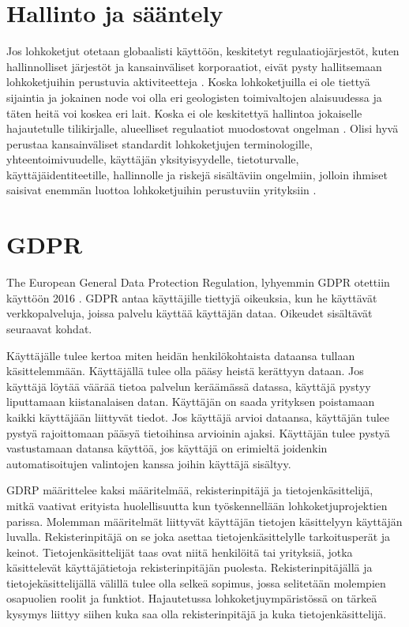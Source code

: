 \documentclass[utf8,bachelor]{gradu3}
\begin{document}
\section{Hallinto ja sääntely}
Jos lohkoketjut otetaan globaalisti käyttöön, keskitetyt regulaatiojärjestöt, kuten hallinnolliset järjestöt ja kansainväliset korporaatiot, eivät pysty hallitsemaan lohkoketjuihin perustuvia aktiviteetteja \parencite{wright2015decentralized}.
Koska lohkoketjuilla ei ole tiettyä sijaintia ja jokainen node voi olla eri geologisten toimivaltojen alaisuudessa ja täten heitä voi koskea eri lait. 
Koska ei ole keskitettyä hallintoa jokaiselle hajautetulle tilikirjalle, alueelliset regulaatiot muodostovat ongelman \parencite{cermeno2016blockchain}.
Olisi hyvä perustaa kansainväliset standardit lohkoketjujen terminologille, yhteentoimivuudelle, käyttäjän yksityisyydelle, tietoturvalle, käyttäjäidentiteetille, hallinnolle ja riskejä sisältäviin ongelmiin, jolloin ihmiset saisivat enemmän luottoa lohkoketjuihin perustuviin yrityksiin \parencite{ali2019blockchain}.

\section{GDPR}

The European General Data Protection Regulation, lyhyemmin GDPR otettiin käyttöön 2016 \parencite{GDPR}.
GDPR antaa käyttäjille tiettyjä oikeuksia, kun he käyttävät verkkopalveluja, joissa palvelu käyttää käyttäjän dataa. Oikeudet sisältävät seuraavat kohdat.

Käyttäjälle tulee kertoa miten heidän henkilökohtaista dataansa tullaan käsittelemmään.
Käyttäjällä tulee olla pääsy heistä kerättyyn dataan.
Jos käyttäjä löytää väärää tietoa palvelun keräämässä datassa, käyttäjä pystyy liputtamaan kiistanalaisen datan.
Käyttäjän on saada yrityksen poistamaan kaikki käyttäjään liittyvät tiedot.
Jos käyttäjä arvioi dataansa, käyttäjän tulee pystyä rajoittomaan pääsyä tietoihinsa  arvioinin ajaksi.
Käyttäjän tulee pystyä vastustamaan datansa käyttöä, jos käyttäjä on erimieltä joidenkin automatisoitujen valintojen kanssa joihin käyttäjä sisältyy.

GDRP määrittelee kaksi määritelmää, rekisterinpitäjä ja tietojenkäsittelijä, mitkä vaativat erityista huolellisuutta kun työskennellään lohkoketjuprojektien parissa. Molemman määritelmät liittyvät käyttäjän tietojen käsittelyyn käyttäjän luvalla.
Rekisterinpitäjä on se joka asettaa tietojenkäsittelylle tarkoitusperät ja keinot. Tietojenkäsittelijät taas ovat niitä henkilöitä tai yrityksiä, jotka käsittelevät käyttäjätietoja rekisterinpitäjän puolesta. Rekisterinpitäjällä ja tietojekäsittelijällä välillä tulee olla selkeä sopimus, jossa selitetään molempien osa\-puolien roolit ja funktiot.
Hajautetussa lohkoketjuympäristössä on tärkeä kysymys liittyy siihen kuka saa olla rekisterinpitäjä ja kuka tietojenkäsittelijä.
\end{document}
